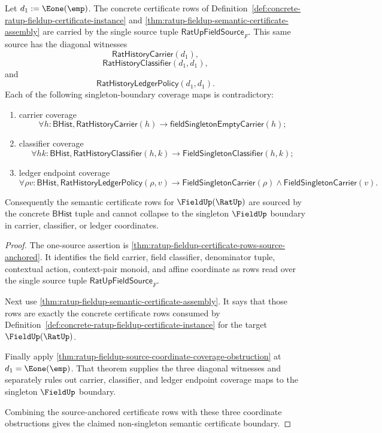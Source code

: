 \begin{theorem}
\label{thm:ratup-fieldup-semantic-certificate-non-singleton}
Let $d_1:=\Eone(\emp)$. The concrete certificate rows of
Definition~\ref{def:concrete-ratup-fieldup-certificate-instance} and
\autoref{thm:ratup-fieldup-semantic-certificate-assembly} are carried by the
single source tuple $\mathsf{RatUpFieldSource}_F$. This same source has the
diagonal witnesses
$$
\mathsf{RatHistoryCarrier}(d_1),
$$
$$
\mathsf{RatHistoryClassifier}(d_1,d_1),
$$
and
$$
\mathsf{RatHistoryLedgerPolicy}(d_1,d_1).
$$
Each of the following singleton-boundary coverage maps is contradictory:
\begin{enumerate}
  \item carrier coverage
  $$
  \forall h:\mathsf{BHist},\mathsf{RatHistoryCarrier}(h)\to
  \mathsf{fieldSingletonEmptyCarrier}(h);
  $$
  \item classifier coverage
  $$
  \forall h k:\mathsf{BHist},\mathsf{RatHistoryClassifier}(h,k)\to
  \mathsf{FieldSingletonClassifier}(h,k);
  $$
  \item ledger endpoint coverage
  $$
  \forall \rho v:\mathsf{BHist},\mathsf{RatHistoryLedgerPolicy}(\rho,v)\to
  \mathsf{FieldSingletonCarrier}(\rho)\land
  \mathsf{FieldSingletonCarrier}(v).
  $$
\end{enumerate}
Consequently the semantic certificate rows for $\FieldUp(\RatUp)$ are sourced
by the concrete $\mathsf{BHist}$ tuple and cannot collapse to the singleton
$\FieldUp$ boundary in carrier, classifier, or ledger coordinates.
\end{theorem}
\begin{proof}
The one-source assertion is
\autoref{thm:ratup-fieldup-certificate-rows-source-anchored}. It identifies the
field carrier, field classifier, denominator tuple, contextual action,
context-pair monoid, and affine coordinate as rows read over the single source
tuple $\mathsf{RatUpFieldSource}_F$.

Next use \autoref{thm:ratup-fieldup-semantic-certificate-assembly}. It says
that those rows are exactly the concrete certificate rows consumed by
Definition~\ref{def:concrete-ratup-fieldup-certificate-instance} for the
target $\FieldUp(\RatUp)$.

Finally apply
\autoref{thm:ratup-fieldup-source-coordinate-coverage-obstruction} at
$d_1=\Eone(\emp)$. That theorem supplies the three diagonal witnesses and
separately rules out carrier, classifier, and ledger endpoint coverage maps to
the singleton $\FieldUp$ boundary.

Combining the source-anchored certificate rows with these three coordinate
obstructions gives the claimed non-singleton semantic certificate boundary.
\end{proof}

